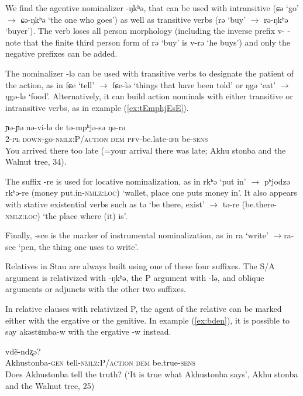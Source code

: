 \documentclass[oneside,a4paper,11pt]{article}
\newcommand{\ipa}[1]{{\phon #1}} %
\begin{document}
We find the agentive nominalizer \ipa{-ŋkʰə}, that can be used with intransitive (\ipa{ɕə}  `go' $\rightarrow$ \ipa{ɕə-ŋkʰə} `the one who goes') as well as transitive verbs (\ipa{rə} `buy' $\rightarrow$ \ipa{rə-ŋkʰə} `buyer'). The verb loses all person morphology (including the inverse prefix \ipa{v-} - note that the finite third person form of \ipa{rə} `buy' is \ipa{v-rə} `he buys') and only the negative prefixes can be added.
 
The nominalizer \ipa{-lə} can be used with transitive verbs to designate the patient of the action, as in \ipa{fɕe} `tell' $\rightarrow$ \ipa{fɕe-lə} `things that have been told' or \ipa{ŋgə} `eat' $\rightarrow$ \ipa{ŋgə-lə} `food'. Alternatively, it can build action nominals with either transitive or intransitive verbs, as  in example (\ref{ex:tEmphjEsE}).

\begin{exe}
\ex \label{ex:tEmphjEsE} 
\gll
\ipa{ɲə-ɲə} 	\ipa{nə-vi-lə} 	\ipa{de} 	\ipa{tə-mpʰjə-sə} 	\ipa{ŋə-rə} \\
2-\textsc{pl} \textsc{down}-go-\textsc{nmlz:P/action} \textsc{dem} \textsc{pfv}-be.late-\textsc{ifr} be-\textsc{sens}\\
\glt You arrived there too late (=your arrival there was late; Akhu stonba and the Walnut tree, 34).
\end{exe}

The suffix \ipa{-re} is used for locative nominalization, as in \ipa{rkʰə} `put in' $\rightarrow$ \ipa{pʰjodzə} \ipa{rkʰə-re} (money put.in-\textsc{nmlz:loc}) `wallet, place one puts money in'. It also appears with stative existential verbs such as \ipa{tə} `be there, exist' $\rightarrow$ \ipa{tə-re} (be.there-\textsc{nmlz:loc}) `the place where (it) is'. 

Finally, \ipa{-sce} is the marker of instrumental nominalization, as in \ipa{ra} `write' $\rightarrow$\ipa{ra-sce} `pen, the thing one uses to write'.

Relatives in Stau are always built using one of these four suffixes. The S/A  argument is relativized with \ipa{-ŋkʰə}, the P argument with \ipa{-lə}, and oblique arguments or adjuncts with the other two suffixes. 

In relative clauses with relativized P, the agent of the relative can be marked either with the ergative or the genitive. In example (\ref{ex:bden}), it is possible to say  \ipa{akəstɞmba-w} with the ergative \ipa{-w} instead.

\begin{exe}
\ex \label{ex:bden}
\gll 
 [\ipa{akəstɞmba-j} 	\ipa{fɕe-lə}] 	\ipa{de} 	\ipa{vdẽ-ndʐə?} \\
 Akhustonba-\textsc{gen} tell-\textsc{nmlz:P/action} \textsc{dem} be.true-\textsc{sens} \\
\glt Does Akhustonba tell the truth?  (`It is true what Akhustonba says', Akhu stonba and the Walnut tree, 25)
\end{exe}
\end{document}
